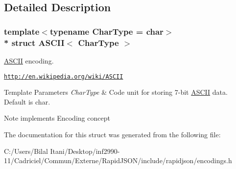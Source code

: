 \subsection{Detailed Description}
\subsubsection*{template$<$typename Char\+Type = char$>$\\*
struct A\+S\+C\+I\+I$<$ Char\+Type $>$}

\hyperlink{struct_a_s_c_i_i}{A\+S\+C\+II} encoding. 

\href{http://en.wikipedia.org/wiki/ASCII}{\tt http\+://en.\+wikipedia.\+org/wiki/\+A\+S\+C\+II} 
\begin{DoxyTemplParams}{Template Parameters}
{\em Char\+Type} & Code unit for storing 7-\/bit \hyperlink{struct_a_s_c_i_i}{A\+S\+C\+II} data. Default is char. \\
\hline
\end{DoxyTemplParams}
\begin{DoxyNote}{Note}
implements Encoding concept 
\end{DoxyNote}


The documentation for this struct was generated from the following file\+:\begin{DoxyCompactItemize}
\item 
C\+:/\+Users/\+Bilal Itani/\+Desktop/inf2990-\/11/\+Cadriciel/\+Commun/\+Externe/\+Rapid\+J\+S\+O\+N/include/rapidjson/encodings.\+h\end{DoxyCompactItemize}
